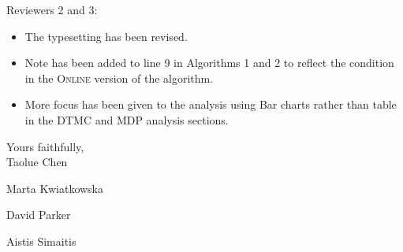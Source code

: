 \documentclass[a4paper,10pt]{article}
\begin{document}
\noindent Reviewers 2 and 3:
\begin{itemize}

\item The typesetting has been revised.
\item Note has been added to line 9 in Algorithms 1 and 2 to reflect the condition in the \textsc{Online} version of the algorithm.
\item More focus has been given to the analysis using Bar charts rather than table in the DTMC and MDP analysis sections.


\end{itemize}

\noindent Yours faithfully,\\


\noindent Taolue Chen

\noindent Marta Kwiatkowska

\noindent David Parker

\noindent Aistis Simaitis
\end{document}
